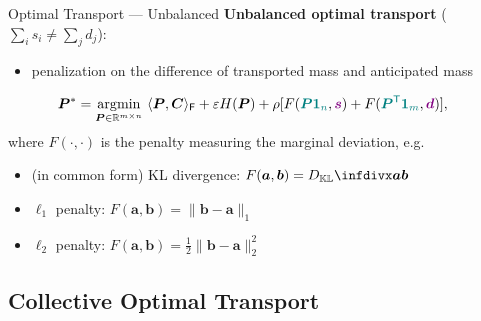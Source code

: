 \documentclass[10pt]{beamer}
\begin{document}
\begin{frame}{Optimal Transport
--- Unbalanced}
    \textbf{Unbalanced optimal transport} ($\sum_i s_i \neq \sum_j d_j$):
    \begin{itemize}
        \item penalization on the difference of {\color{teal}transported mass} and {\color{violet}anticipated mass}
    \end{itemize}
    
    \begin{align}
        \bm{P}^* = \operatorname*{\arg\!min}_{\bm{P}\in\mathbb{R}^{m\times n}} & ~ \langle\bm{P},\bm{C}\rangle_\mathsf{F} 
        + \varepsilon H(\bm{P})
        + \rho[
        F({\color{teal}\bm{P1}_n},{\color{violet}\bm{s}})
        +F({\color{teal}\bm{P}^\mathsf{T}\bm{1}_m},{\color{violet}\bm{d}})],
    \end{align}
    where $F(\cdot,\cdot)$ is the penalty measuring the marginal deviation, 
    e.g.
    \begin{itemize}
        \item (in common form) KL divergence: $F(\bm{a},\bm{b})=\infdiv{\bm{a}}{\bm{b}}$
        \item $\ell_1$ penalty: $F(\bm{a},\bm{b})=\|\bm{b}-\bm{a}\|_1$
        \item $\ell_2$ penalty: $F(\bm{a},\bm{b})=\frac{1}{2}\|\bm{b}-\bm{a}\|_2^2$
    \end{itemize}
\end{frame}







\subsection{Collective Optimal Transport}
\end{document}
